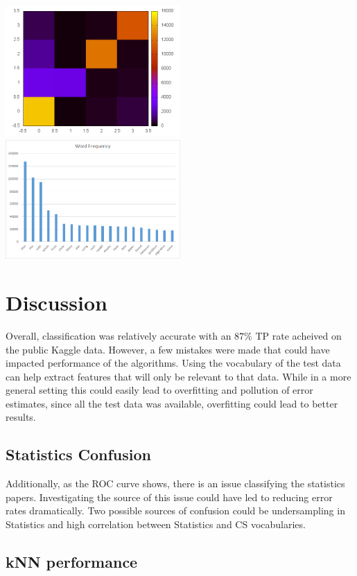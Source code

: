 \documentclass[10pt,twocolumn]{article}
\begin{document}
\includegraphics[width=0.5\textwidth]{./confusion.png}
\includegraphics[width=0.5\textwidth]{./word_frequency.png}
\section*{Discussion}

Overall, classification was relatively accurate with an $87\%$ TP rate acheived on the public Kaggle data. However, a few mistakes were made that could have impacted performance of the algorithms. Using the vocabulary of the test data can help extract features that will only be relevant to that data.  While in a more general setting this could easily lead to overfitting and pollution of error estimates, since all the test data was available, overfitting could lead to better results. 

\subsection*{Statistics Confusion}

Additionally, as the ROC curve shows, there is an issue classifying the statistics papers. Investigating the source of this issue could have led to reducing error rates dramatically. Two possible sources of confusion could be undersampling in Statistics and high correlation between Statistics and CS vocabularies.

\subsection*{kNN performance}
\end{document}
